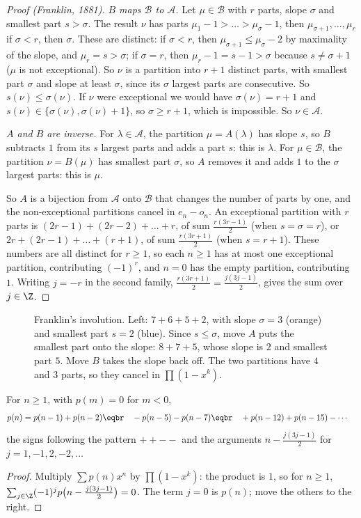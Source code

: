 \begin{proof}[Proof (Franklin, 1881)]
\emph{$B$ maps $\mathcal B$ to $\mathcal A$.} Let $\mu\in\mathcal B$ with $r$ parts, slope $\sigma$ and smallest part $s>\sigma$. The
result $\nu$ has parts $\mu_1-1>\dots>\mu_\sigma-1$, then $\mu_{\sigma+1},\dots,\mu_r$ if $\sigma<r$, then $\sigma$. These are distinct: if
$\sigma<r$, then $\mu_{\sigma+1}\le\mu_\sigma-2$ by maximality of the slope, and $\mu_r=s>\sigma$; if $\sigma=r$, then $\mu_r-1=s-1>\sigma$
because $s\ne\sigma+1$ ($\mu$ is not exceptional). So $\nu$ is a partition into $r+1$ distinct parts, with smallest part $\sigma$
and slope at least $\sigma$, since its $\sigma$ largest parts are consecutive. So $s(\nu)\le\sigma(\nu)$. If $\nu$ were exceptional
we would have $\sigma(\nu)=r+1$ and $s(\nu)\in\{\sigma(\nu),\sigma(\nu)+1\}$, so $\sigma\ge r+1$, which is impossible. So $\nu\in\mathcal A$.

\emph{$A$ and $B$ are inverse.} For $\lambda\in\mathcal A$, the partition $\mu=A(\lambda)$ has slope $s$, so $B$ subtracts $1$ from its
$s$ largest parts and adds a part $s$: this is $\lambda$. For $\mu\in\mathcal B$, the partition $\nu=B(\mu)$ has smallest part $\sigma$,
so $A$ removes it and adds $1$ to the $\sigma$ largest parts: this is $\mu$.

So $A$ is a bijection from $\mathcal A$ onto $\mathcal B$ that changes the number of parts by one, and the non-exceptional
partitions cancel in $e_n-o_n$. An exceptional partition with $r$ parts is $(2r-1)+(2r-2)+\dots+r$, of sum $\frac{r(3r-1)}2$
(when $s=\sigma=r$), or $2r+(2r-1)+\dots+(r+1)$, of sum $\frac{r(3r+1)}2$ (when $s=r+1$). These numbers are all distinct for
$r\ge1$, so each $n\ge1$ has at most one exceptional partition, contributing $(-1)^r$, and $n=0$ has the empty partition,
contributing $1$. Writing $j=-r$ in the second family, $\frac{r(3r+1)}2=\frac{j(3j-1)}2$, gives the sum over $j\in\Z$.
\end{proof}

\begin{figure}[ht]
\centering
{}
\caption{Franklin's involution. Left: $7+6+5+2$, with slope $\sigma=3$ (orange) and smallest part $s=2$ (blue). Since
$s\le\sigma$, move $A$ puts the smallest part onto the slope: $8+7+5$, whose slope is $2$ and smallest part $5$. Move $B$
takes the slope back off. The two partitions have $4$ and $3$ parts, so they cancel in $\prod(1-x^k)$.}
\label{fig:franklin}
\end{figure}

\begin{corollary}\label{cor:partitionrec}
For $n\ge1$, with $p(m)=0$ for $m<0$,
\[
\begin{aligned}p(n)&=p(n-1)+p(n-2)\eqbr\quad-p(n-5)-p(n-7)\eqbr\quad+p(n-12)+p(n-15)-\cdots\end{aligned}
\]
the signs following the pattern $++--$ and the arguments $n-\frac{j(3j-1)}2$ for $j=1,-1,2,-2,\dots$
\end{corollary}
\begin{proof}
Multiply $\sum p(n)x^n$ by $\prod(1-x^k)$: the product is $1$, so for $n\ge1$,
$\sum_{j\in\Z}(-1)^jp\bigl(n-\frac{j(3j-1)}2\bigr)=0$. The term $j=0$ is $p(n)$; move the others to the right.
\end{proof}

